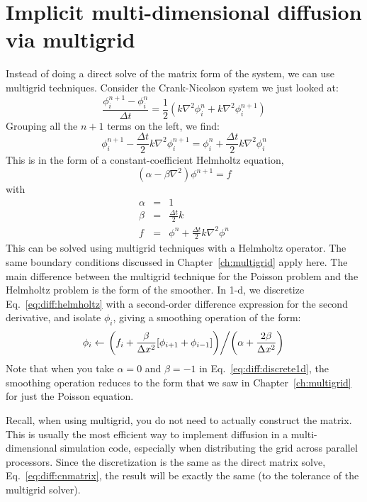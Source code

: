 \section{Implicit multi-dimensional diffusion via multigrid}
\label{diff:sec:implicit_mg}

Instead of doing a direct solve of the matrix form of the system, we 
can use multigrid techniques.  Consider the Crank-Nicolson system we just 
looked at:
\begin{equation}
\frac{\phi^{n+1}_i - \phi^n_i}{\Delta t} = 
   \frac{1}{2} \left ( k \nabla^2 \phi^n_i + k \nabla^2 \phi^{n+1}_i \right )
\end{equation}
Grouping all the 
$n+1$ terms on the left, we find:
\begin{equation}
\phi^{n+1}_i - \frac{\Delta t}{2} k \nabla^2 \phi^{n+1}_i = 
    \phi^n_i + \frac{\Delta t}{2} k \nabla^2 \phi^n_i
\end{equation}
This is in the form of a constant-coefficient Helmholtz equation,
\begin{equation}
\label{eq:diff:helmholtz}
(\alpha - \beta \nabla^2) \phi^{n+1} = f
\end{equation}
with
\begin{eqnarray}
\alpha &=& 1 \\
\beta &=& \frac{\Delta t}{2} k \\
f &=& \phi^n + \frac{\Delta t}{2} k \nabla^2 \phi^n
\end{eqnarray}
This can be solved using multigrid techniques with a Helmholtz
operator.  The same boundary conditions discussed in
Chapter~\ref{ch:multigrid} apply here.  The main difference between
the multigrid technique for the Poisson problem and the Helmholtz
problem is the form of the smoother.  In 1-d, we discretize
Eq.~\ref{eq:diff:helmholtz} with a second-order difference expression
for the second derivative, and isolate $\phi_i$, giving a smoothing
operation of the form:
\begin{equation}
\label{eq:diff:discrete1d}
\phi_{i} \leftarrow
 \left .    \left ( f_{i} + \frac{\beta}{\Delta x^2} [\phi_{i+1}
                             + \phi_{i-1}] \right ) \middle / 
\left ( \alpha + \frac{2 \beta}{\Delta x^2}  \right )  \right .
\end{equation}
Note that when you take $\alpha = 0$ and $\beta = -1$ in
Eq.~\ref{eq:diff:discrete1d}, the smoothing operation reduces to the
form that we saw in Chapter~\ref{ch:multigrid} for just the Poisson
equation.

Recall, when using multigrid, you do not need to actually construct the
matrix.  This is usually the most efficient way to implement diffusion
in a multi-dimensional simulation code, especially when distributing
the grid across parallel processors.  Since the discretization is the
same as the direct matrix solve, Eq.~\ref{eq:diff:cnmatrix}, the
result will be exactly the same (to the tolerance of the multigrid
solver).

